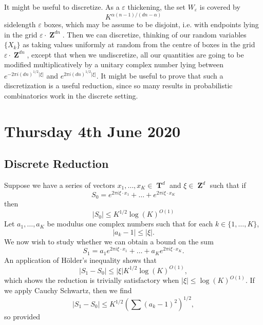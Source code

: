 \documentclass[openany,nobib,nols,a4paper,twoside,symmetric,justified,notoc]{tufte-book}
\theoremstyle{plain}
\theoremstyle{remark}
\theoremstyle{definition}
\DeclareMathOperator{\TT}{\mathbf{T}}
\DeclareMathOperator{\ZZ}{\mathbf{Z}}
\begin{document}
It might be useful to discretize. As a $\varepsilon$ thickening, the set $W_\varepsilon$ is covered by
%
\[ K^{\alpha (n-1) / (dn - \alpha)} \]
%
sidelength $\varepsilon$ boxes, which may be assume to be disjoint, i.e. with endpoints lying in the grid $\varepsilon \cdot \ZZ^{dn}$. Then we can discretize, thinking of our random variables $\{ X_k \}$ as taking values uniformly at random from the centre of boxes in the grid $\varepsilon \cdot \ZZ^{dn}$, except that when we undiscretize, all our quantities are going to be modified multiplicatively by a unitary complex number lying between $e^{- 2 \pi i (dn)^{1/2} |\xi|}$ and $e^{2  \pi i (dn)^{1/2} |\xi|}$. It might be useful to prove that such a discretization is a useful reduction, since so many results in probabilistic combinatorics work in the discrete setting.









\chapter{Thursday 4th June 2020} \label{04062020}

\section{Discrete Reduction}

Suppose we have a series of vectors $x_1, \dots, x_K \in \TT^d$ and $\xi \in \ZZ^d$ such that if
%
\[ S_0 = e^{2 \pi i \xi \cdot x_1} + \dots + e^{2 \pi i \xi \cdot x_K} \]
%
then
%
\[ |S_0| \leq K^{1/2} \log(K)^{O(1)} \]
%
Let $a_1, \dots, a_K$ be modulus one complex numbers such that for each $k \in \{ 1, \dots, K \}$,
%
\[ |a_k - 1| \leq |\xi|. \]
%
We now wish to study whether we can obtain a bound on the sum
%
\[ S_1 = a_1 e^{2 \pi i \xi \cdot x_1} + \dots + a_K e^{2 \pi i \xi \cdot x_K}. \]
%
An application of H\"{o}lder's inequality shows that
%
\[ |S_1 - S_0| \leq |\xi| K^{1/2} \log(K)^{O(1)}, \]
%
which shows the reduction is trivially satisfactory when $|\xi| \leq \log(K)^{O(1)}$. If we apply Cauchy Schwartz, then we find
%
\[ |S_1 - S_0| \leq K^{1/2} \left( \sum (a_k - 1)^2 \right)^{1/2}, \]
%
so provided 









\end{document}
